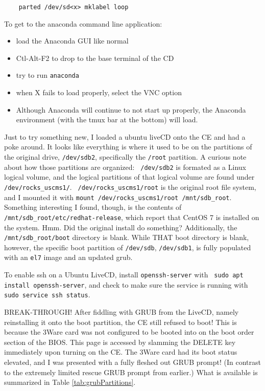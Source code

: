 \documentclass[12pt]{article}
\begin{document}
\begin{tcolorbox}[title=Completely Wipe USB, colback=white, colframe=black,
  coltitle=green]
  \begin{verbatim}
    parted /dev/sd<x> mklabel loop
  \end{verbatim}
\end{tcolorbox}

\qq To get to the anaconda command line application:
\begin{itemize}
  \item load the Anaconda GUI like normal
  \item Ctl-Alt-F2 to drop to the base terminal of the CD
  \item try to run {\tt anaconda}
  \item when X fails to load properly, select the VNC option
  \item Although Anaconda will continue to not start up properly, the Anaconda
    environment (with the tmux bar at the bottom) will load.
\end{itemize}

\qq Just to try something new, I loaded a ubuntu liveCD onto the CE and had a
poke around. It looks like everything is where it used to be on the partitions
of the original drive, {\tt /dev/sdb2}, specifically the {\tt /root}
partition. A curious note about how those partitions are organized: {\tt
  /dev/sdb2} is formated as a Linux logical volume, and the logical partitions
of that logical volume are found under {\tt /dev/rocks\_uscms1/}. {\tt
  /dev/rocks\_uscms1/root} is the original root file system, and I mounted it
with {\tt mount /dev/rocks\_uscms1/root /mnt/sdb\_root}. Something interesting I
found, though, is the contents of {\tt /mnt/sdb\_root/etc/redhat-release}, which
report that CentOS 7 is installed on the system. Hmm. Did the original install
do something? Additionally, the {\tt /mnt/sdb\_root/boot} directory is
blank. While THAT boot directory is blank, however, the specific boot partition
of {\tt /dev/sdb}, {\tt /dev/sdb1}, is fully populated with an {\tt el7} image
and an updated grub. 

\qq To enable ssh on a Ubuntu LiveCD, install {\tt openssh-server} with {\tt
  sudo apt install openssh-server}, and check to make sure the service is running
with {\tt sudo service ssh status}.

\qq BREAK-THROUGH! After fiddling with GRUB from the LiveCD, namely reinstalling
it onto the boot partition, the CE still refused to boot! This is because the
3Ware card was not configured to be booted into on the boot order section of the
BIOS. This page is accessed by slamming the DELETE key immediately upon
turning on the CE. The 3Ware card had its boot status elevated, and I was
presented with a fully fleshed out GRUB prompt! (In contrast to the extremely
limited rescue GRUB prompt from earlier.) What is available is summarized in
Table \ref{tab:grubPartitions}.
\end{document}
